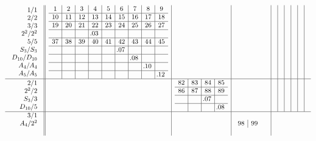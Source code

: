 \documentclass[12pt,a4paper]{amsart}
\begin{document}
\begin{align*}
  \begin{array}{r||c|c|c|c|c|c|c|c|c}
    \begin{array}{r}
      1/1 \\ 2/2 \\ 3/3 \\ 2^2/2^2 \\ 5/5 \\ S_3/S_3 \\
      D_{10}/D_{10} \\ A_4/A_4 \\ A_5/A_5
    \end{array}
&
  \begin{array}{c|c|c|c|c|c|c|c|c}
1&2&3&4&5&6&7&8&9\\
\hline
10&11&12&13&14&15&16&17&18\\
\hline
19&20&21&22&23&24&25&26&27\\
\hline
&&&{\llap.03}&&&&&\\
\hline
37&38&39&40&41&42&43&44&45\\
\hline
&&&&&\llap.07&&&\\
\hline
&&&&&&{\llap.08}&&\\
\hline
&&&&&&&{\llap.10}&\\
\hline
&&&&&&&&{\llap.12}\\
  \end{array}
&&&&&&&& \\\hline
    \begin{array}{r}
      2/1 \\ 2^2/2 \\ S_3/3 \\ D_{10}/5 \\
    \end{array}
&&
   \begin{array}{c|c|c|c}
     82&83&84&85\\
\hline
86&87&88&89\\
\hline
&&\llap.07&\\
\hline
&&&{\llap.08}\\
   \end{array}
&&&&&&& \\\hline
    \begin{array}{r}
      3/1 \\ A_4/2^2 \\ \\
    \end{array}
&&&
    \begin{array}{c|cc}
      98&99&\\

\end{array}
\end{array}
\end{align*}
\end{document}
